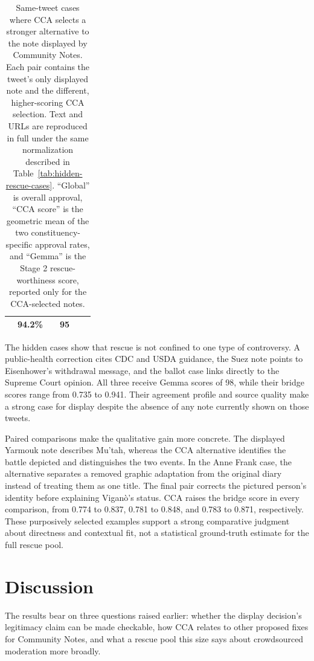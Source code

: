 \documentclass[10pt,twocolumn]{article}
\begin{document}
\begin{table}[t]
\begin{tabularx}{\textwidth}{@{}p{2.1cm}p{1.25cm}>{\raggedright\arraybackslash}Xrrr@{}}
& 94.2\% & 0.871 & 95 \\
\bottomrule
\end{tabularx}
\caption{Same-tweet cases where CCA selects a stronger alternative to the note
displayed by Community Notes. Each pair contains the tweet's only displayed
note and the different, higher-scoring CCA selection. Text and URLs are
reproduced in full under the same normalization described in
Table~\ref{tab:hidden-rescue-cases}. ``Global'' is overall approval, ``CCA
score'' is the geometric mean of the two constituency-specific approval rates,
and ``Gemma'' is the Stage 2 rescue-worthiness score, reported only for the
CCA-selected notes.}
\label{tab:better-alternatives}
\end{table}

The hidden cases show that rescue is not confined to one type of controversy.
A public-health correction cites CDC and USDA guidance, the Suez note points
to Eisenhower's withdrawal message, and the ballot case links directly to the
Supreme Court opinion. All three receive Gemma scores of 98, while their bridge
scores range from 0.735 to 0.941. Their agreement profile and source quality
make a strong case for display despite the absence of any note currently shown
on those tweets.

Paired comparisons make the qualitative gain more concrete. The displayed
Yarmouk note describes Mu'tah, whereas the CCA alternative identifies the
battle depicted and distinguishes the two events. In the Anne Frank case, the
alternative separates a removed graphic adaptation from the original diary
instead of treating them as one title. The final pair corrects the pictured
person's identity before explaining Vigan\`o's status. CCA raises the bridge
score in every comparison, from 0.774 to 0.837, 0.781 to 0.848, and 0.783 to
0.871, respectively. These purposively selected examples support a strong
comparative judgment about directness and contextual fit, not a statistical
ground-truth estimate for the full rescue pool.

\section{Discussion}

The results bear on three questions raised earlier: whether the display
decision's legitimacy claim can be made checkable, how CCA relates to other
proposed fixes for Community Notes, and what a rescue pool this size says
about crowdsourced moderation more broadly.
\end{document}
